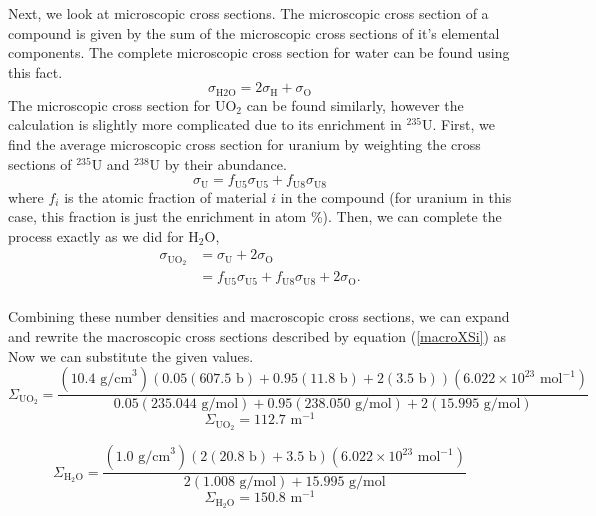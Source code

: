 \begin{enumerate}[a)]
Next, we look at microscopic cross sections. The microscopic cross section of a compound is given by the sum of the microscopic cross sections of it's elemental components. The complete microscopic cross section for water can be found using this fact.
$$ \sigma_{\text{H2O}} = 2\sigma_{\text{H}} + \sigma_{\text{O}} $$
The microscopic cross section for UO$_2$ can be found similarly, however the calculation is slightly more complicated due to its enrichment in $^{235}$U. First, we find the average microscopic cross section for uranium by weighting the cross sections of $^{235}$U and $^{238}$U by their abundance.
$$ \sigma_{\text{U}} = f_{\text{U}5} \sigma_{\text{U}5} + f_{\text{U}8} \sigma_{\text{U}8} $$
where $f_{i}$ is the atomic fraction of material $i$ in the compound (for uranium in this case, this fraction is just the enrichment in atom \%). Then, we can complete the process exactly as we did for H$_2$O,
\begin{align*}
\sigma_{\text{UO}_2}	&= \sigma_{\text{U}} + 2\sigma_{\text{O}} \\
						&= f_{\text{U}5} \sigma_{\text{U}5} + f_{\text{U}8} \sigma_{\text{U}8}  + 2\sigma_{\text{O}}. 
\end{align*}
\-\\

Combining these number densities and macroscopic cross sections, we can expand and rewrite the macroscopic cross sections described by equation (\ref{macroXSi}) as
Now we can substitute the given values. 
$$ \Sigma_{\text{UO}_2} = \frac{\left(10.4\text{ g/cm}^3\right) \left(0.05(607.5\text{ b}) + 0.95(11.8\text{ b})  + 2(3.5\text{ b})\right)\left(6.022\times10^{23}\text{ mol}^{-1}\right)}{0.05(235.044\text{ g/mol}) + 0.95(238.050\text{ g/mol}) + 2(15.995\text{ g/mol})} $$
$$ \Sigma_{\text{UO}_2} = 112.7\text{ m}^{-1} $$

$$ \Sigma_{\text{H}_2\text{O}} = \frac{\left(1.0\text{ g/cm}^3\right) \left(2(20.8\text{ b}) + 3.5\text{ b}\right) \left(6.022\times10^{23}\text{ mol}^{-1}\right)}{2(1.008\text{ g/mol}) + 15.995\text{ g/mol}} $$
$$ \Sigma_{\text{H}_2\text{O}} = 150.8\text{ m}^{-1} $$


\end{enumerate}
